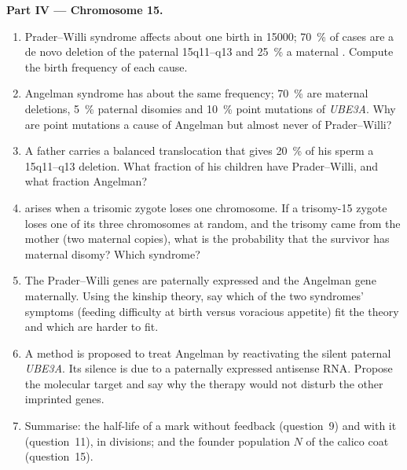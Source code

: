 \begin{problem}
\medskip
\noindent\textbf{Part IV --- Chromosome 15.}
\begin{enumerate}[resume]
  \item Prader--Willi syndrome affects about one birth in
        \num{15000}; \qty{70}{\%} of cases are a de novo deletion of
        the paternal 15q11--q13 and \qty{25}{\%} a maternal . Compute the birth frequency of each cause.
  \item Angelman syndrome has about the same frequency; \qty{70}{\%}
        are maternal deletions, \qty{5}{\%} paternal disomies and
        \qty{10}{\%} point mutations of \emph{UBE3A}. Why are point
        mutations a cause of Angelman but almost never of Prader--Willi?
  \item A father carries a balanced translocation that gives
        \qty{20}{\%} of his sperm a 15q11--q13 deletion. What fraction
        of his children have Prader--Willi, and what fraction Angelman?
  \item {} arises when a trisomic zygote loses one
        chromosome. If a trisomy-15 zygote loses one of its three
        chromosomes at random, and the trisomy came from the mother
        (two maternal copies), what is the probability that the
        survivor has maternal disomy? Which syndrome?
  \item The Prader--Willi genes are paternally expressed and the
        Angelman gene maternally. Using the kinship theory, say which
        of the two syndromes' symptoms (feeding difficulty at birth
        versus voracious appetite) fit the theory and which are
        harder to fit.
  \item A method is proposed to treat Angelman by reactivating the
        silent paternal \emph{UBE3A}. Its silence is due to a paternally
        expressed antisense RNA. Propose the molecular target and say
        why the therapy would not disturb the other imprinted genes.
  \item Summarise: the half-life of a mark without feedback
        (question~9) and with it (question~11), in divisions; and the
        founder population $N$ of the calico coat (question~15).
\end{enumerate}
\end{problem}
